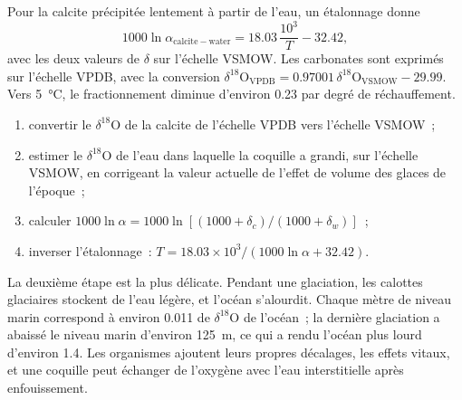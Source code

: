 Pour la calcite précipitée lentement à partir de l'eau, un étalonnage donne
\[
1000\ln\alpha_{\mathrm{calcite-water}} = 18.03\,\frac{10^3}{T} - 32.42,
\]
avec les deux valeurs de $\delta$ sur l'échelle VSMOW. Les carbonates sont exprimés sur l'échelle
VPDB, avec la conversion $\delta^{18}\mathrm O_{\mathrm{VPDB}} =
0.97001\,\delta^{18}\mathrm O_{\mathrm{VSMOW}} - 29.99$. Vers \qty{5}{\celsius}, le
fractionnement diminue d'environ \qty{0.23}{\permil} par degré de réchauffement.

\begin{method}\label{met:b3:stable-isotopes:palaeotemperature}
\begin{enumerate}
\item convertir le $\delta^{18}\mathrm O$ de la calcite de l'échelle VPDB vers l'échelle VSMOW~;
\item estimer le $\delta^{18}\mathrm O$ de l'eau dans laquelle la coquille a grandi, sur
l'échelle VSMOW, en corrigeant la valeur actuelle de l'effet de volume des glaces de l'époque~;
\item calculer $1000\ln\alpha = 1000\ln[(1000 + \delta_c)/(1000 + \delta_w)]$~;
\item inverser l'étalonnage~: $T = 18.03\times10^3/(1000\ln\alpha + 32.42)$.
\end{enumerate}
\end{method}

La deuxième étape est la plus délicate. Pendant une glaciation, les calottes glaciaires stockent
de l'eau légère, et l'océan s'alourdit. Chaque mètre de niveau marin correspond
à environ \qty{0.011}{\permil} de $\delta^{18}\mathrm O$ de l'océan~; la dernière
glaciation a abaissé le niveau marin d'environ \qty{125}{m}, ce qui a rendu
l'océan plus lourd d'environ \qty{1.4}{\permil}. Les organismes ajoutent leurs propres décalages, les
effets vitaux, et une coquille peut échanger de l'oxygène avec l'eau interstitielle après enfouissement.

